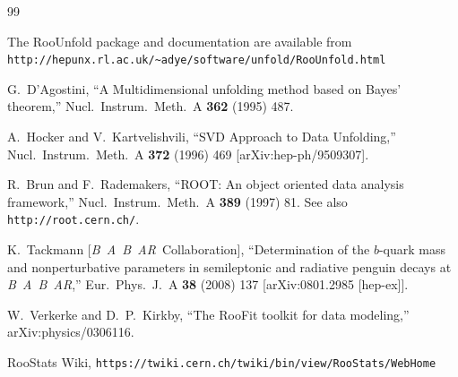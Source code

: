 \documentclass{desyproc}
\newcommand{\babar}{\mbox{\sl B\hspace{-0.4em} {\small\sl A}\hspace{-0.37em} \sl B\hspace{-0.4em} {\small\sl A\hspace{-0.02em}R}}}
\begin{document}

\begin{footnotesize}

\begin{thebibliography}{99}

  The RooUnfold package and documentation are available from\\
  \verb=http://hepunx.rl.ac.uk/~adye/software/unfold/RooUnfold.html=

  G.~D'Agostini,
  ``A Multidimensional unfolding method based on Bayes' theorem,''
  Nucl.\ Instrum.\ Meth.\  A {\bf 362} (1995) 487.

  A.~Hocker and V.~Kartvelishvili,
  ``SVD Approach to Data Unfolding,''
  Nucl.\ Instrum.\ Meth.\  A {\bf 372} (1996) 469
  [arXiv:hep-ph/9509307].

  R.~Brun and F.~Rademakers,
  ``ROOT: An object oriented data analysis framework,''
  Nucl.\ Instrum.\ Meth.\  A {\bf 389} (1997) 81.
  See also \verb=http://root.cern.ch/=.

  K.~Tackmann [\babar\ Collaboration],
  ``Determination of the $b$-quark mass and nonperturbative parameters in semileptonic and radiative penguin decays at \babar,''
  Eur.\ Phys.\ J.\  A {\bf 38} (2008) 137
  [arXiv:0801.2985 [hep-ex]].

  W.~Verkerke and D.~P.~Kirkby,
  ``The RooFit toolkit for data modeling,''
  arXiv:physics/0306116.

  RooStats Wiki,
  \verb=https://twiki.cern.ch/twiki/bin/view/RooStats/WebHome=

\end{thebibliography}

\end{footnotesize}

\end{document}
